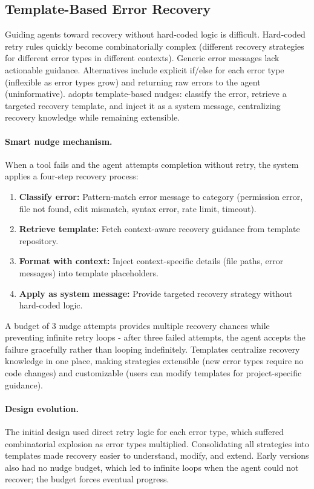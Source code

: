 \subsection{Template-Based Error Recovery}
\label{sec:error_recovery}

Guiding agents toward recovery without hard-coded logic is difficult. Hard-coded retry rules quickly become combinatorially complex (different recovery strategies for different error types in different contexts). Generic error messages lack actionable guidance. Alternatives include explicit if/else for each error type (inflexible as error types grow) and returning raw errors to the agent (uninformative). \name adopts template-based nudges: classify the error, retrieve a targeted recovery template, and inject it as a system message, centralizing recovery knowledge while remaining extensible.

\paragraph{Smart nudge mechanism.} When a tool fails and the agent attempts completion without retry, the system applies a four-step recovery process:

\begin{enumerate}
\item \textbf{Classify error:} Pattern-match error message to category (permission error, file not found, edit mismatch, syntax error, rate limit, timeout).
\item \textbf{Retrieve template:} Fetch context-aware recovery guidance from template repository.
\item \textbf{Format with context:} Inject context-specific details (file paths, error messages) into template placeholders.
\item \textbf{Apply as system message:} Provide targeted recovery strategy without hard-coded logic.
\end{enumerate}

A budget of 3 nudge attempts provides multiple recovery chances while preventing infinite retry loops - after three failed attempts, the agent accepts the failure gracefully rather than looping indefinitely. Templates centralize recovery knowledge in one place, making strategies extensible (new error types require no code changes) and customizable (users can modify templates for project-specific guidance).

\paragraph{Design evolution.} The initial design used direct retry logic for each error type, which suffered combinatorial explosion as error types multiplied. Consolidating all strategies into templates made recovery easier to understand, modify, and extend. Early versions also had no nudge budget, which led to infinite loops when the agent could not recover; the budget forces eventual progress.

